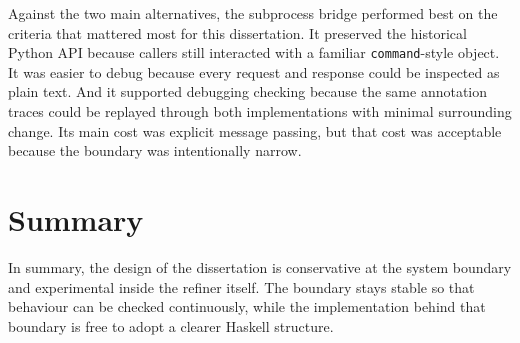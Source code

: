 Against the two main alternatives, the subprocess bridge performed
best on the criteria that mattered most for this dissertation. It preserved the
historical Python API because callers still interacted with a familiar
\texttt{command}-style object. It was easier to debug because every
request and response could be inspected as plain text. And it supported
debugging checking because the same annotation traces could be replayed
through both implementations with minimal surrounding change. Its main
cost was explicit message passing, but that cost was acceptable because
the boundary was intentionally narrow.


\section{Summary}
\label{sec:SummaryDesign}

In summary, the design of the dissertation is conservative at the system boundary and experimental inside the refiner itself. The boundary stays stable so that behaviour can be checked continuously, while the implementation behind that boundary is free to adopt a clearer Haskell structure.